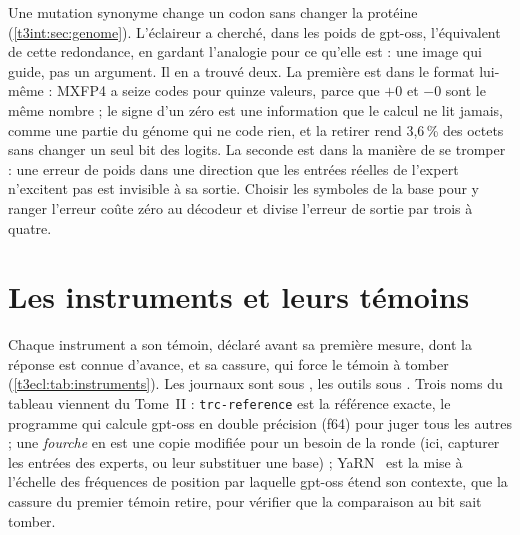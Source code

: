 \begin{enbref}
Une mutation synonyme change un codon sans changer la protéine (\cref{t3int:sec:genome}). L'éclaireur a cherché, dans les poids de gpt-oss, l'équivalent de cette redondance, en gardant l'analogie pour ce qu'elle est : une image qui guide, pas un argument. Il en a trouvé deux. La première est dans le format lui-même : MXFP4 a seize codes pour quinze valeurs, parce que $+0$ et $-0$ sont le même nombre ; le signe d'un zéro est une information que le calcul ne lit jamais, comme une partie du génome qui ne code rien, et la retirer rend 3,6\,\% des octets sans changer un seul bit des logits. La seconde est dans la manière de se tromper : une erreur de poids dans une direction que les entrées réelles de l'expert n'excitent pas est invisible à sa sortie. Choisir les symboles de la base pour y ranger l'erreur coûte zéro au décodeur et divise l'erreur de sortie par trois à quatre.
\end{enbref}

\section{Les instruments et leurs témoins}\label{t3ecl:sec:instruments}

Chaque instrument a son témoin, déclaré avant sa première mesure, dont la réponse est connue d'avance, et sa cassure, qui force le témoin à tomber (\cref{t3ecl:tab:instruments}). Les journaux sont sous , les outils sous . Trois noms du tableau viennent du Tome~II : \texttt{trc-reference} est la référence exacte, le programme qui calcule gpt-oss en double précision (f64) pour juger tous les autres ; une \emph{fourche} en est une copie modifiée pour un besoin de la ronde (ici, capturer les entrées des experts, ou leur substituer une base) ; YaRN~\cite{peng2023yarn} est la mise à l'échelle des fréquences de position par laquelle gpt-oss étend son contexte, que la cassure du premier témoin retire, pour vérifier que la comparaison au bit sait tomber.

